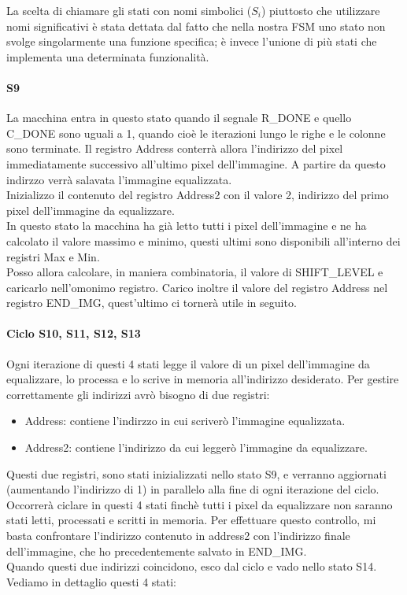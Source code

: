 La scelta di chiamare gli stati con nomi simbolici ($S_i$) piuttosto che utilizzare nomi significativi è stata dettata dal fatto che nella nostra FSM uno stato non svolge singolarmente una funzione specifica; è invece l'unione di più stati che implementa una determinata funzionalità.
\paragraph{S9}
La macchina entra in questo stato quando il segnale R\_DONE e quello C\_DONE sono uguali a 1, quando cioè le iterazioni lungo le righe e le colonne sono terminate.
Il registro Address conterrà allora l'indirizzo del pixel immediatamente successivo all'ultimo pixel dell'immagine. A partire da questo indirzzo verrà salavata l'immagine equalizzata.\\
Inizializzo il contenuto del registro Address2 con il valore 2, indirizzo del primo pixel dell'immagine da equalizzare.\\
In questo stato la macchina ha già letto tutti i pixel dell'immagine e ne ha calcolato il valore massimo e minimo, questi ultimi sono disponibili all'interno dei registri Max e Min.\\
Posso allora calcolare, in maniera combinatoria, il valore di SHIFT\_LEVEL e caricarlo nell'omonimo registro.
Carico inoltre il valore del registro Address nel registro END\_IMG, quest'ultimo ci tornerà utile in seguito.\\
\paragraph{Ciclo S10, S11, S12, S13}
Ogni iterazione di questi 4 stati legge il valore di un pixel dell'immagine da equalizzare, lo processa e lo scrive in memoria all'indirizzo desiderato.
Per gestire correttamente gli indirizzi avrò bisogno di due registri:
\begin{itemize}
    \item Address: contiene l'indirzzo in cui scriverò l'immagine equalizzata.
    \item Address2: contiene l'indirizzo da cui leggerò l'immagine da equalizzare.
\end{itemize}
Questi due registri, sono stati inizializzati nello stato S9, e verranno aggiornati (aumentando l'indirizzo di 1) in parallelo alla fine di ogni iterazione del ciclo.
Occorrerà ciclare in questi 4 stati finchè tutti i pixel da equalizzare non saranno stati letti, processati e scritti in memoria. Per effettuare questo controllo, mi basta confrontare l'indirizzo contenuto in address2 con l'indirizzo finale dell'immagine, che ho precedentemente salvato in END\_IMG.\\
Quando questi due indirizzi coincidono, esco dal ciclo e vado nello stato S14.
Vediamo in dettaglio questi 4 stati:
